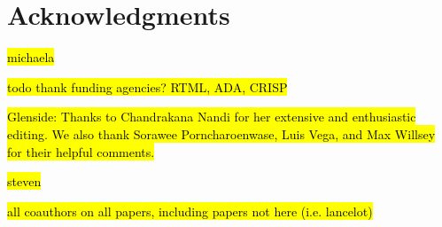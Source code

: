 \chapter*{Acknowledgments}

\hl{michaela}

\hl{todo thank funding agencies?
RTML, ADA, CRISP}

\hl{
Glenside:
Thanks to Chandrakana Nandi
  for her extensive and enthusiastic
  editing.
We also thank 
  Sorawee Porncharoenwase,
  Luis Vega, and
  Max Willsey
  for their helpful comments.
}

\hl{steven}

\hl{all coauthors on all papers, including papers not here (i.e. lancelot)}
\clearpage